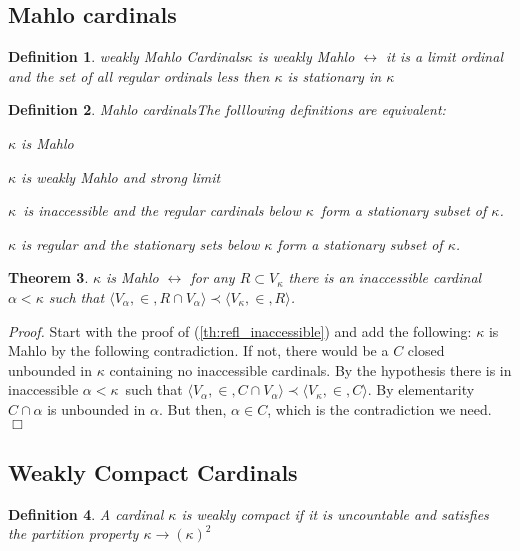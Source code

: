 \documentclass[12pt,a4paper]{article}
\newtheorem{theorem}{Theorem}[section]
\newtheorem{definition}[theorem]{Definition}
\newenvironment{proof}
{\noindent \textit{Proof.}}
{\hspace*{\fill} $\Box$}
\renewcommand{\iff}{\leftrightarrow}
\newcommand{\then}{\rightarrow}
\newcommand{\bce}{\begin{compactenum}}
\newcommand{\ece}{\end{compactenum}}
\begin{document}
%
%

\subsection{Mahlo cardinals}
\begin{definition}{weakly Mahlo Cardinals}\label{def:weakly_mahlo}
$\kappa$ is \emph{weakly Mahlo} $\iff$ it is a limit ordinal and the set of all regular ordinals less then $\kappa$ is stationary in $\kappa$
\end{definition}

\begin{definition}{Mahlo cardinals}\label{def:mahlo}
The folllowing definitions are equivalent:
\bce[(i)]
\item $\kappa$ is Mahlo
\item $\kappa$ is weakly Mahlo and strong limit
\item $\kappa$ is inaccessible and the regular cardinals below $\kappa$ form a stationary subset of $\kappa$.
\item $\kappa$ is regular and the stationary sets below $\kappa$ form a stationary subset of $\kappa$.
\ece
\end{definition}

\begin{theorem}\label{th:refl_mahlo}
$\kappa$ is Mahlo $\iff$ for any $R \subset V_\kappa$ there is an inaccessible cardinal $\alpha < \kappa$ such that $\langle V_\alpha, \in, R \cap V_\alpha \rangle \prec \langle V_\kappa, \in, R \rangle$.
\end{theorem}

\begin{proof}
Start with the proof of (\ref{th:refl_inaccessible}) and add the following:\newline
$\kappa$ is Mahlo by the following contradiction. If not, there would be a $C$ closed unbounded in $\kappa$ containing no inaccessible cardinals. By the hypothesis there is in inaccessible $\alpha < \kappa$ such that $\langle V_\alpha, \in, C \cap V_\alpha \rangle \prec \langle V_\kappa, \in, C \rangle$. By elementarity $C \cap \alpha$ is unbounded in $\alpha$. But then, $\alpha \in C$, which is the contradiction we need.
\end{proof}

\subsection{Weakly Compact Cardinals}
\begin{definition}
A cardinal $\kappa$ is \emph{weakly compact} if it is uncountable and satisfies the partition property $\kappa \then (\kappa)^2$
\end{definition}
\end{document}
